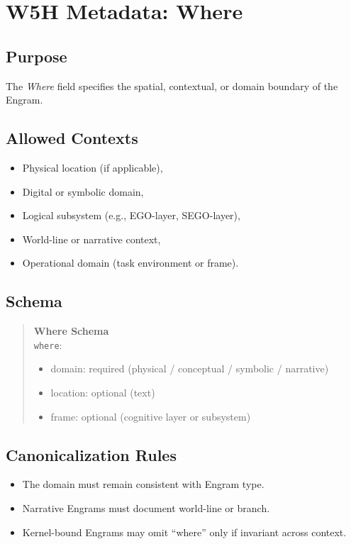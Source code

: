 \chapter{W5H Metadata: Where}
\label{chap:W5H_Where}

\section{Purpose}

The \emph{Where} field specifies the spatial, contextual, or domain boundary of
the Engram.

\section{Allowed Contexts}

\begin{itemize}
    \item Physical location (if applicable),
    \item Digital or symbolic domain,
    \item Logical subsystem (e.g., EGO-layer, SEGO-layer),
    \item World-line or narrative context,
    \item Operational domain (task environment or frame).
\end{itemize}

\section{Schema}

\begin{quote}
\textbf{Where Schema}\\
\texttt{where}: 
\begin{itemize}
    \item domain: required (physical / conceptual / symbolic / narrative)
    \item location: optional (text)
    \item frame: optional (cognitive layer or subsystem)
\end{itemize}
\end{quote}

\section{Canonicalization Rules}

\begin{itemize}
    \item The domain must remain consistent with Engram type.
    \item Narrative Engrams must document world-line or branch.
    \item Kernel-bound Engrams may omit ``where'' only if invariant across context.
\end{itemize}
